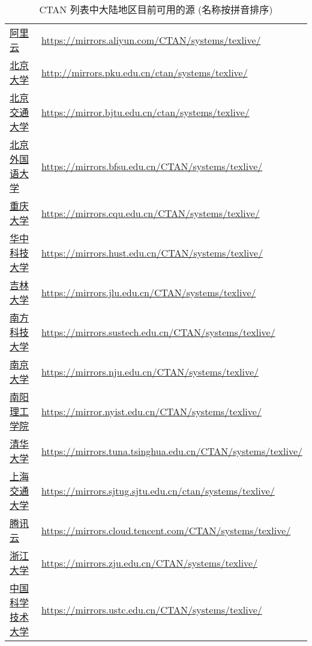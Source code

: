 \begin{table}
  \centering
  \caption{CTAN 列表中大陆地区目前可用的源 (名称按拼音排序)}\label{tab:appendix:mirror}
  \begin{tabular}{*{2}{l}}
    \hline\hline
    \href{https://developer.aliyun.com/mirror/}{阿里云}
    & \url{https://mirrors.aliyun.com/CTAN/systems/texlive/}\\
    \href{http://mirrors.pku.edu.cn/Mirrors}{北京大学}
    & \url{http://mirrors.pku.edu.cn/ctan/systems/texlive/}\\
    \href{https://mirror.bjtu.edu.cn/}{北京交通大学}
    & \url{https://mirror.bjtu.edu.cn/ctan/systems/texlive/}\\
    \href{https://mirrors.bfsu.edu.cn/}{北京外国语大学}
    & \url{https://mirrors.bfsu.edu.cn/CTAN/systems/texlive/}\\
    \href{https://mirrors.cqu.edu.cn/}{重庆大学}
    & \url{https://mirrors.cqu.edu.cn/CTAN/systems/texlive/}\\
    \href{https://mirrors.hust.edu.cn/}{华中科技大学}
    & \url{https://mirrors.hust.edu.cn/CTAN/systems/texlive/}\\
    \href{https://mirrors.jlu.edu.cn/}{吉林大学}
    & \url{https://mirrors.jlu.edu.cn/CTAN/systems/texlive/}\\
    \href{https://mirrors.sustech.edu.cn/}{南方科技大学}
    & \url{https://mirrors.sustech.edu.cn/CTAN/systems/texlive/}\\
    \href{https://mirrors.nju.edu.cn/}{南京大学}
    & \url{https://mirrors.nju.edu.cn/CTAN/systems/texlive/}\\
    \href{https://mirror.nyist.edu.cn/}{南阳理工学院}
    & \url{https://mirror.nyist.edu.cn/CTAN/systems/texlive/}\\
    \href{https://mirrors.tuna.tsinghua.edu.cn/}{清华大学}
    & \url{https://mirrors.tuna.tsinghua.edu.cn/CTAN/systems/texlive/}\\
    \href{https://mirrors.sjtug.sjtu.edu.cn/}{上海交通大学}
    & \url{https://mirrors.sjtug.sjtu.edu.cn/ctan/systems/texlive/}\\
    \href{https://mirrors.cloud.tencent.com/}{腾讯云}
    & \url{https://mirrors.cloud.tencent.com/CTAN/systems/texlive/}\\
    \href{https://mirrors.zju.edu.cn/}{浙江大学}
    & \url{https://mirrors.zju.edu.cn/CTAN/systems/texlive/}\\
    \href{https://mirrors.ustc.edu.cn/}{中国科学技术大学}
    & \url{https://mirrors.ustc.edu.cn/CTAN/systems/texlive/}\\
    \hline\hline
  \end{tabular}
\end{table}

